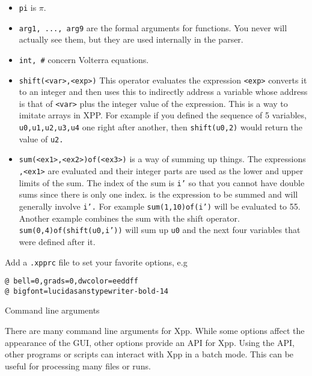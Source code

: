 \begin{itemize}
\item {\tt  pi}  is $\pi.$ 
\item {\tt arg1, ..., arg9} are the formal arguments for functions. You never will actually see them, but they are used internally in the parser. 
\item {\tt int, \#} concern Volterra equations.
\item {\tt shift(<var>,<exp>)} This operator evaluates the expression
{\tt <exp>} converts it to an integer and then uses this to indirectly
address a variable whose address is that of {\tt <var>} plus the
integer value of the expression.  This is a way to imitate arrays in
XPP.  For example if you defined the sequence of 5 variables, {\tt
u0,u1,u2,u3,u4} one right after another, then {\tt shift(u0,2)} would
return the value of {\tt u2.} 
\item {\tt sum(<ex1>,<ex2>)of(<ex3>)} is a way of summing up things.
The expressions {\tt <ex1>,<ex1>} are evaluated and their integer
parts are used as the lower and upper limits of the sum.  The index of
the sum is {\tt i'} so that you cannot have double sums since there is
only one index.  {\tt <ex3>} is the expression to be summed and will
generally involve {\tt i'.}  For example  {\tt sum(1,10)of(i')} will
be evaluated to 55.  Another example combines the sum with the shift
operator.  {\tt sum(0,4)of(shift(u0,i'))} will sum up {\tt u0} and the
next four variables that were defined after it.  
\end{itemize}




\medskip
\noindent Add a {\tt .xpprc} file to set your favorite options, e.g
\begin{verbatim}
@ bell=0,grads=0,dwcolor=eeddff
@ bigfont=lucidasanstypewriter-bold-14
\end{verbatim}

\medskip

\begin{center} {\large Command line arguments}\end{center}

\medskip
There are many command line arguments for Xpp.  While some options affect the appearance of the GUI, other options provide an API for Xpp.  Using the API, other programs or scripts can interact with Xpp in a batch mode.  This can be useful for processing many files or runs. 

